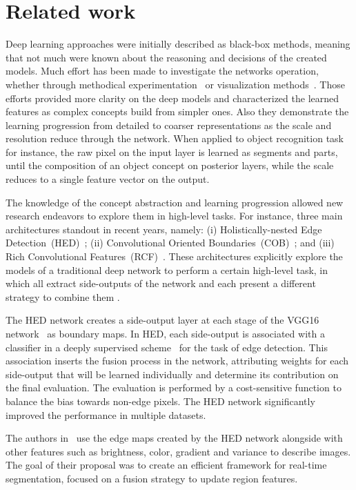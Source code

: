 \section{Related work}
\label{sec:related}

Deep learning approaches were initially described as black-box methods, meaning that not much were known about the reasoning and decisions of the created models. Much effort has been made to investigate the networks operation, whether through methodical experimentation~\cite{ilin17,kuo16,eigen14,zhang17} or visualization methods~\cite{simonyan13,zeiler14}. Those efforts provided more clarity on the deep models and characterized the learned features as complex concepts build from simpler ones. Also they demonstrate the learning progression from detailed to coarser representations as the scale and resolution reduce through the network.  When applied to object recognition task for instance, the raw pixel on the input layer is learned as segments and parts, until the composition of an object concept on posterior layers, while the scale reduces to a single feature vector on the output.  

The knowledge of the concept abstraction and learning progression allowed new research endeavors to explore  them in high-level tasks. For instance, three main architectures standout in recent years, namely: (i) Holistically-nested Edge Detection~(HED)~\cite{xie2015}; (ii) Convolutional Oriented Boundaries~(COB)~\cite{maninis2017}; and (iii) Rich Convolutional Features~(RCF)~\cite{liu2017}. These architectures explicitly explore the models of a traditional deep network to perform a certain high-level task, in which all extract side-outputs of the network and each present a different strategy to combine them . 

The HED network creates a side-output layer at each stage of the VGG16 network~\cite{simonyan2014} as boundary maps. In HED, each side-output is associated with a classifier in a deeply supervised scheme~\cite{lee2015} for the task of edge detection. This association inserts the fusion process in the network, attributing weights for each side-output that will be learned individually and determine its contribution on the final evaluation. The evaluation is performed by a cost-sensitive function to balance the bias towards non-edge pixels. The HED network significantly improved the performance in multiple datasets.

The authors in~\cite{cheng2016} use the edge maps created by the HED network alongside with other features such as brightness, color, gradient and variance to describe images. The goal of their proposal was to create an efficient framework for real-time segmentation, focused on a fusion strategy to update region features.


